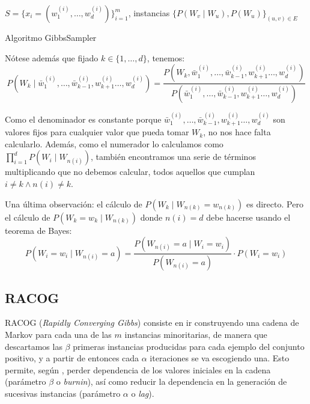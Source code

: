 \begin{algorithm}[H]
\begin{algorithmic}[1]
  \REQUIRE $S = \{x_i=(w_1^{(i)}, \ldots, w_d^{(i)})\}_{i=1}^m$, instancias
  \REQUIRE $\{P(W_v \mid W_u), P(W_u)\}_{(u,v)\in E}$
    \ENDFOR
  \ENDFOR
\end{algorithmic}
\caption{Algoritmo GibbsSampler}
\label{alg:gibbs}
\end{algorithm}



Nótese además que fijado $k\in \{1, \ldots, d\}$, tenemos: 
\[
  P(W_k \mid \bar{w}_1^{(i)}, \ldots, \bar{w}_{k-1}^{(i)}, w_{k+1}^{(i)} \ldots, w_{d}^{(i)}) = 
  \frac{P(W_k, \bar{w}_1^{(i)}, \ldots, \bar{w}_{k-1}^{(i)}, w_{k+1}^{(i)} \ldots, w_{d}^{(i)})}
      {P(\bar{w}_1^{(i)}, \ldots, \bar{w}_{k-1}^{(i)}, w_{k+1}^{(i)} \ldots, w_{d}^{(i)})}
\]

Como el denominador es constante porque $\bar{w}_1^{(i)}, \ldots, \bar{w}_{k-1}^{(i)}, w_{k+1}^{(i)} \ldots, w_{d}^{(i)}$
son valores fijos para cualquier valor que pueda tomar $W_k$, no nos hace falta calcularlo. Además, como el
numerador lo calculamos como $\prod_{i=1}^d P(W_i \mid W_{n(i)})$, también encontramos una serie de términos 
multiplicando que no debemos calcular, todos aquellos que cumplan $i\neq k \wedge n(i) \neq k$.

Una última observación: el cálculo de $P(W_k \mid W_{n(k)} = w_{n(k)})$ es directo. Pero el cálculo de 
$P(W_k = w_k \mid W_{n(k)})$ donde $n(i) = d$ debe hacerse usando el teorema de Bayes:
\[
  P(W_i = w_i \mid W_{n(i)} = a) = \frac{P(W_{n(i)} = a \mid W_i = w_i)}{P(W_{n(i)} = a)} \cdot P(W_i = w_i)
\] 

\subsection{RACOG}
RACOG (\textit{Rapidly Converging Gibbs}) consiste en ir construyendo una cadena de Markov para cada una de 
las $m$ instancias minoritarias, de manera que descartamos las $\beta$ primeras instancias producidas para 
cada ejemplo del conjunto positivo, y a partir de entonces cada $\alpha$ iteraciones se va escogiendo una. 
Esto permite, según \citep{das2015}, perder dependencia de los valores iniciales en la cadena 
(parámetro $\beta$ o \textit{burnin}), así como reducir la dependencia en la generación de sucesivas instancias 
(parámetro $\alpha$ o \textit{lag}).

